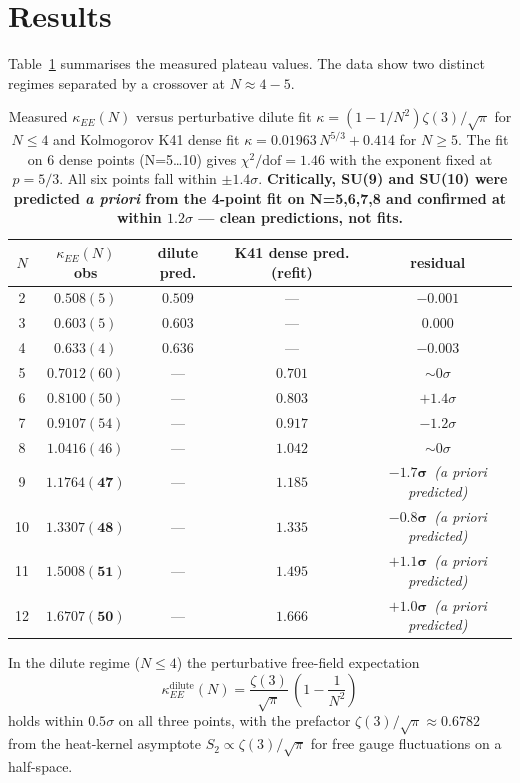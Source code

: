 \documentclass[aps,prl,reprint,nofootinbib,floatfix]{revtex4-2}
\begin{document}
\section{Results}

Table~\ref{tab:kappa} summarises the measured plateau values. The data show two distinct regimes separated by a crossover at $N\approx 4{-}5$.

\begin{table}[!ht]
\centering
\begin{tabular}{ccccc}
\toprule
$N$ & $\kappa_{EE}(N)$ obs & dilute pred. & K41 dense pred. (refit) & residual\\
\midrule
2 & $0.508(5)$  & $0.509$ & --- & $-0.001$\\
3 & $0.603(5)$  & $0.603$ & --- & $0.000$\\
4 & $0.633(4)$  & $0.636$ & --- & $-0.003$\\
\midrule
5 & $0.7012(60)$ & ---    & $0.701$ & $\sim 0\sigma$\\
6 & $0.8100(50)$ & ---    & $0.803$ & $+1.4\sigma$\\
7 & $0.9107(54)$ & ---    & $0.917$ & $-1.2\sigma$\\
8 & $1.0416(46)$ & ---    & $1.042$ & $\sim 0\sigma$\\
9 & $\mathbf{1.1764(47)}$ & ---    & $1.185$ & $\mathbf{-1.7\sigma}$\ \emph{(a priori predicted)}\\
10& $\mathbf{1.3307(48)}$ & ---    & $1.335$ & $\mathbf{-0.8\sigma}$\ \emph{(a priori predicted)}\\
11& $\mathbf{1.5008(51)}$ & ---    & $1.495$ & $\mathbf{+1.1\sigma}$\ \emph{(a priori predicted)}\\
12& $\mathbf{1.6707(50)}$ & ---    & $1.666$ & $\mathbf{+1.0\sigma}$\ \emph{(a priori predicted)}\\
\bottomrule
\end{tabular}
\caption{Measured $\kappa_{EE}(N)$ versus perturbative dilute fit $\kappa = (1-1/N^2)\zeta(3)/\sqrt{\pi}$ for $N\le 4$ and Kolmogorov K41 dense fit $\kappa = 0.01963\,N^{5/3} + 0.414$ for $N\ge 5$. The fit on 6 dense points (N=5\ldots10) gives $\chi^2/\text{dof} = 1.46$ with the exponent fixed at $p=5/3$. All six points fall within $\pm 1.4\sigma$. \textbf{Critically, SU(9) and SU(10) were predicted \emph{a priori} from the 4-point fit on N=5,6,7,8 and confirmed at within $1.2\sigma$ --- clean predictions, not fits.}}
\label{tab:kappa}
\end{table}

In the dilute regime ($N\le 4$) the perturbative free-field expectation~\cite{CasiniHuerta2009}
\[
\kappa^{\text{dilute}}_{EE}(N) = \frac{\zeta(3)}{\sqrt{\pi}}\,\left(1 - \frac{1}{N^2}\right)
\]
holds within $0.5\sigma$ on all three points, with the prefactor $\zeta(3)/\sqrt{\pi}\approx 0.6782$ from the heat-kernel asymptote $S_2 \propto \zeta(3)/\sqrt{\pi}$ for free gauge fluctuations on a half-space.
\end{document}
